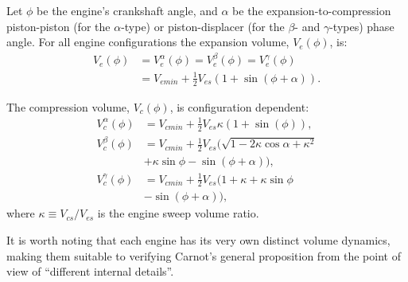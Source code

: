     Let $\phi$ be the engine's crankshaft angle, and $\alpha$  be  the  expansion-to-compression
    piston-piston  (for  the  $\alpha$-type)  or  piston-displacer   (for   the   $\beta$-   and
    $\gamma$-types)  phase  angle.  For  all  engine  configurations   the   expansion   volume,
    $V_e(\phi)$, is:
    \begin{align}
        \label{eq:Ve}
        V_e(\phi) &= V^{\alpha}_e(\phi) = V^{\beta}_e(\phi) = V^{\gamma}_e(\phi) \nonumber\\
                  &= V_{emin} + \frac{1}{2} V_{es}(1 + \sin(\phi + \alpha)).
    \end{align}

    The compression volume, $V_c(\phi)$, is configuration dependent:
    \begin{align}
        \label{eq:Vca}
        V^{\alpha}_c(\phi) &= V_{cmin} + \frac{1}{2} V_{es} \kappa (1 + \sin(\phi)), \\
        \label{eq:Vcb}
        V^{\beta}_c(\phi)  &= V_{cmin} +
            \frac{1}{2} V_{es} (\sqrt{1 - 2\kappa\cos\alpha + \kappa^2} \nonumber\\
                           &+ \kappa\sin\phi - \sin(\phi + \alpha)), \\
        \label{eq:Vcg}
        V^{\gamma}_c(\phi) &= V_{cmin} + \frac{1}{2} V_{es}
            (1 + \kappa + \kappa\sin\phi \nonumber\\
                           &- \sin(\phi + \alpha)),
    \end{align}
    \noindent where $\kappa \equiv V_{cs}/V_{es}$ is the engine sweep volume ratio.

    It is worth noting that each engine has its very own distinct volume dynamics,  making  them
    suitable to verifying Carnot's general proposition from the point  of  view  of  ``different
    internal details''.

